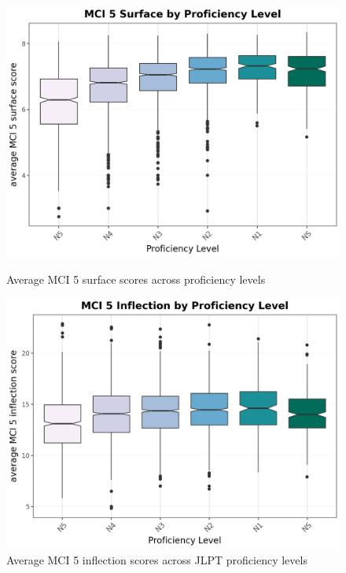 \begin{figure}[htbp]
    \centering
    \begin{minipage}{.48\textwidth}
        \centering
    \includegraphics[scale=.4]{img/MCI5surface}
    \caption[MCI 5 surface scores across Proficiency levels]{Average MCI 5 surface scores across proficiency levels}
        \label{fig:MCI5surface}
    \end{minipage}
    \hfill
\begin{minipage}{.48\textwidth}
        \centering
        \includegraphics[scale=.4]{img/MCI5inflection}
        \caption[MCI 5 inflection scores across Proficiency levels]{Average MCI 5 inflection scores across JLPT proficiency levels}
\label{fig:MCI5inflection}
\end{minipage}
    \end{figure}

